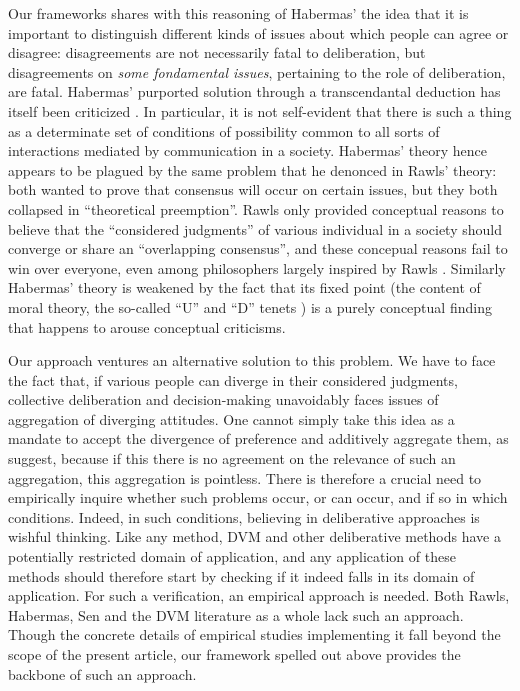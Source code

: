 \documentclass[version=3.21, pagesize, twoside=off, bibliography=totoc, DIV=calc, fontsize=12pt, a4paper, french, english]{scrartcl}
\begin{document}
Our frameworks shares with this reasoning of Habermas' the idea that it is important to distinguish different kinds of issues about which people can agree or disagree: disagreements are not necessarily fatal to deliberation, but disagreements on \emph{some fondamental issues}, pertaining to the role of deliberation, are fatal. Habermas' purported solution through a transcendantal deduction has itself been criticized \citep{heath_communicative_2001}. In particular, it is not self-evident that there is such a thing as a determinate set of conditions of possibility common to all sorts of interactions mediated by communication in a society. Habermas' theory hence appears to be plagued by the same problem that he denonced in Rawls' theory: both wanted to prove that consensus will occur on certain issues, but they both collapsed in ``theoretical preemption''. Rawls only provided conceptual reasons to believe that the “considered judgments” of various individual in a society should converge or share an “overlapping consensus”, and these concepual reasons fail to win over everyone, even among philosophers largely inspired by Rawls \citep{estlund_insularity_1998, estlund_democratic_2009}. Similarly Habermas' theory is weakened by the fact that its fixed point (the content of moral theory, the so-called “U” and “D” tenets \citep{habermas_moralbewustsein_1983}) is a purely conceptual finding that happens to arouse conceptual criticisms.

Our approach ventures an alternative solution to this problem. We have to face the fact that, if various people can diverge in their considered judgments, collective deliberation and decision-making unavoidably faces issues of aggregation of diverging attitudes. One cannot simply take this idea as a mandate to accept the divergence of preference and additively aggregate them, as \citet{bartkowski_beyond_2018} suggest, because if this there is no agreement on the relevance of such an aggregation, this aggregation is pointless. There is therefore a crucial need to empirically inquire whether such problems occur, or can occur, and if so in which conditions. Indeed, in such conditions, believing in deliberative approaches is wishful thinking. Like any method, DVM and other deliberative methods have a potentially restricted domain of application, and any application of these methods should therefore start by checking if it indeed falls in its domain of application. For such a verification, an empirical approach is needed. Both Rawls, Habermas, Sen and the DVM literature as a whole lack such an approach. Though the concrete details of empirical studies implementing it fall beyond the scope of the present article, our framework spelled out above provides the backbone of such an approach.
\end{document}
